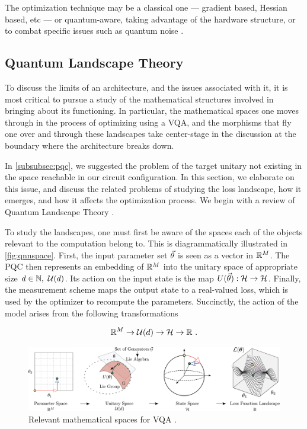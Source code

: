 The optimization technique may be a classical one --- gradient based, Hessian
based, etc --- or quantum-aware, taking advantage of the hardware structure, or
to combat specific issues such as quantum noise
\cite{lavrijsen2020classicalopt,stokes2020quantum,
koczor2019quantum,gacon2021simultaneous,haug2021natural}.

\subsection{Quantum Landscape Theory}
\label{subsec:quantlandscape}

To discuss the limits of an architecture, and the issues associated with it, it
is most critical to pursue a study of the mathematical structures involved in
bringing about its functioning. In particular, the mathematical spaces one moves
through in the process of optimizing using a VQA, and the morphisms that fly one
over and through these landscapes take center-stage in the discussion at the
boundary where the architecture breaks down.

In \autoref{subsubsec:pqc}, we suggested the problem of the target unitary not
existing in the space reachable in our circuit configuration. In this section,
we elaborate on this issue, and discuss the related problems of studying the
loss landscape, how it emerges, and how it affects the optimization process. We
begin with a review of Quantum Landscape Theory \cite[see][chapter
II.B]{larocca2021theory}.

To study the landscapes, one must first be aware of the spaces each of the
objects relevant to the computation belong to. This is diagrammatically
illustrated in \autoref{fig:qnnspace}. First, the input parameter set
\(\vec{\theta}\) is seen as a vector in \(\mathbb{R}^M\). The PQC then represents an
embedding of \(\mathbb{R}^M\) into the unitary space of appropriate size
\(d\in\mathbb{N},~ \mathcal{U}(d)\). Its action on the input state is the map
\(U(\vec{\theta}): \mathcal{H} \to \mathcal{H}\). Finally, the measurement
scheme maps the output state to a real-valued loss, which is used by the
optimizer to recompute the parameters. Succinctly, the action of the model
arises from the following transformations

\begin{gather}
    \mathbb{R}^M \to \mathcal{U}(d) \to \mathcal{H} \to \mathbb{R}~.
    \label{eq:transformations}
\end{gather}

\begin{figure}[!ht]
    \includegraphics[width=\textwidth]{figures/mapsurjective.pdf}
    \caption{Relevant mathematical spaces for VQA \cite[taken from][Figure
            2]{larocca2021theory}.}
    \label{fig:qnnspace}
\end{figure}

